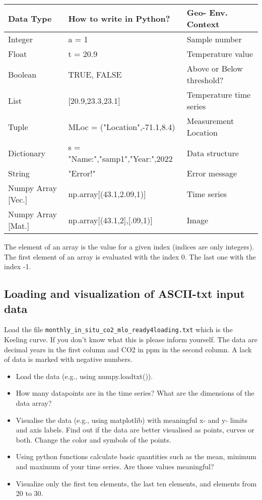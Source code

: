   \begin{tcolorbox}[enhanced jigsaw,breakable,pad at break*=1mm,
  colback=blue!5!white,colframe=babyblueeyes,title=Solutions,
  watermark color=white]
  \begin{center}
   
      \label{tab:table1}
      \begin{tabular}{l|l|l} %
        \textbf{Data Type} & \textbf{How to write in Python?} & \textbf{Geo- Env. Context}\\
        \hline
        Integer & a = 1 & Sample number \\
        Float & t = 20.9 & Temperature value \\
        Boolean & TRUE, FALSE & Above or Below threshold?\\
        List & [20.9,23.3,23.1] & Temperature time series\\
        Tuple & MLoc = ("Location",-71.1,8.4) & Measurement Location \\
        Dictionary & s = {"Name:","samp1","Year:",2022}  & Data structure\\
        String & "Error!" & Error message\\
        Numpy Array [Vec.] & np.array[(43.1,2.09,1)] & Time series\\
        Numpy Array [Mat.] & np.array[(43.1,2],[.09,1)] & Image\\
      \end{tabular}
    \end{center}
  The element of an array is the value for a given index (indices are only integers). The first element of an array is evaluated with the index 0. The last one with the index -1. 
  \end{tcolorbox}
\fi


\subsection{Loading and visualization of ASCII-txt input data}
\label{sec:viskeeling}
Load the file \verb|monthly_in_situ_co2_mlo_ready4loading.txt| which is the Keeling curve. If you don't know what this is please inform yourself. The data are decimal years in the first column and CO2 in ppm in the second column. A lack of data is marked with negative numbers.
\begin{itemize}
\item Load the data (e.g., using numpy.loadtxt()).
\item How many datapoints are in the time series? What are the dimensions of the data array?
\item Visualise the data (e.g., using matplotlib) with  meaningful x- and y- limits and axis labels. Find out if the data are better visualised as points, curves or both. Change the color and symbols of the points.
\item Using python functions calculate basic quantities such as the mean, minimum and maximum of your time series. Are those values meaningful?
\item Visualize only the first ten elements, the last ten elements, and elements from 20 to 30.
\end{itemize}

